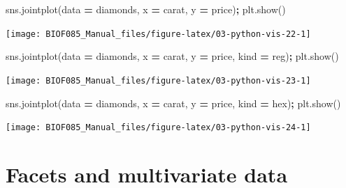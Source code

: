 \documentclass[
  letterpaper,
]{scrbook}
\newenvironment{Shaded}{\begin{snugshade}}{\end{snugshade}}
\newcommand{\NormalTok}[1]{#1}
\newcommand{\OperatorTok}[1]{\textcolor[rgb]{0.81,0.36,0.00}{\textbf{#1}}}
\newcommand{\StringTok}[1]{\textcolor[rgb]{0.31,0.60,0.02}{#1}}
\begin{document}
\begin{Shaded}
\begin{Highlighting}[]
\NormalTok{sns.jointplot(data }\OperatorTok{=}\NormalTok{ diamonds, x }\OperatorTok{=} \StringTok{\textquotesingle{}carat\textquotesingle{}}\NormalTok{, y }\OperatorTok{=} \StringTok{\textquotesingle{}price\textquotesingle{}}\NormalTok{)}\OperatorTok{;}
\NormalTok{plt.show()}
\end{Highlighting}
\end{Shaded}

\begin{center}\texttt{[image: BIOF085\_Manual\_files/figure-latex/03-python-vis-22-1]} \end{center}

\begin{Shaded}
\begin{Highlighting}[]
\NormalTok{sns.jointplot(data }\OperatorTok{=}\NormalTok{ diamonds, x }\OperatorTok{=} \StringTok{\textquotesingle{}carat\textquotesingle{}}\NormalTok{, y }\OperatorTok{=} \StringTok{\textquotesingle{}price\textquotesingle{}}\NormalTok{, kind }\OperatorTok{=} \StringTok{\textquotesingle{}reg\textquotesingle{}}\NormalTok{)}\OperatorTok{;}
\NormalTok{plt.show()}
\end{Highlighting}
\end{Shaded}

\begin{center}\texttt{[image: BIOF085\_Manual\_files/figure-latex/03-python-vis-23-1]} \end{center}

\begin{Shaded}
\begin{Highlighting}[]
\NormalTok{sns.jointplot(data }\OperatorTok{=}\NormalTok{ diamonds, x }\OperatorTok{=} \StringTok{\textquotesingle{}carat\textquotesingle{}}\NormalTok{, y }\OperatorTok{=} \StringTok{\textquotesingle{}price\textquotesingle{}}\NormalTok{, kind }\OperatorTok{=} \StringTok{\textquotesingle{}hex\textquotesingle{}}\NormalTok{)}\OperatorTok{;}
\NormalTok{plt.show()}
\end{Highlighting}
\end{Shaded}

\begin{center}\texttt{[image: BIOF085\_Manual\_files/figure-latex/03-python-vis-24-1]} \end{center}

\hypertarget{facets-and-multivariate-data}{%
\section{Facets and multivariate data}\label{facets-and-multivariate-data}}
\end{document}
